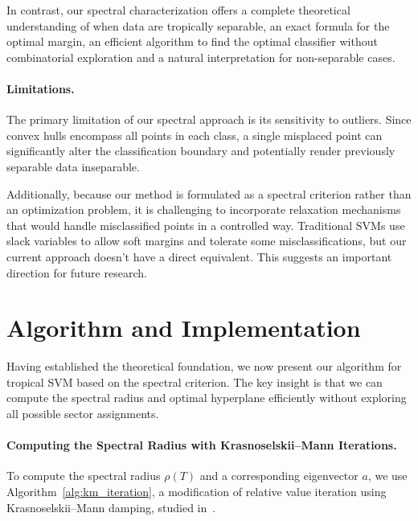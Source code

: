 \documentclass{article}
\begin{document}
In contrast, our spectral characterization offers a complete theoretical understanding of when data are tropically separable, an exact formula for the optimal margin, an efficient algorithm to find the optimal classifier without combinatorial exploration and a natural interpretation for non-separable cases.

\paragraph{Limitations.} 
The primary limitation of our spectral approach is its sensitivity to outliers. Since convex hulls encompass all points in each class, a single misplaced point can significantly alter the classification boundary and potentially render previously separable data inseparable.

Additionally, because our method is formulated as a spectral criterion rather than an optimization problem, it is challenging to incorporate relaxation mechanisms that would handle misclassified points in a controlled way. Traditional SVMs use slack variables to allow soft margins and tolerate some misclassifications, but our current approach doesn't have a direct equivalent. This suggests an important direction for future research.

\section{Algorithm and Implementation}\label{sec:algorithm}

Having established the theoretical foundation, we now present our algorithm for tropical SVM based on the spectral criterion. The key insight is that we can compute the spectral radius and optimal hyperplane efficiently without exploring all possible sector assignments.


\paragraph{Computing the Spectral Radius with Krasnoselskii--Mann Iterations.}
\label{subsec:spectral_computation}
To compute the spectral radius $\rho(T)$ and a corresponding eigenvector $a$, we use
Algorithm~\ref{alg:km_iteration}, a modification of relative value
iteration using Krasnoselskii--Mann damping, studied
in~\cite{akianmfcs}.
\end{document}
